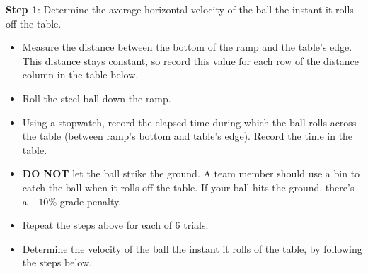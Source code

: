 \documentclass[../main-physics-workbook.tex]{subfiles}
\begin{document}
\vspace{1em}

\noindent \textbf{Step 1}: Determine the average horizontal velocity of the ball the instant it rolls off the table.

\begin{itemize}[itemsep=0pt,topsep=2pt]
    \item Measure the distance between the bottom of the ramp and the table's edge. This distance stays constant, so record this value for each row of the distance column in the table below.
    \item Roll the steel ball down the ramp.
    \item Using a stopwatch, record the elapsed time during which the ball rolls across the table (between ramp's bottom and table's edge). Record the time in the table.
    \item \textbf{DO NOT} let the ball strike the ground. A team member should use a bin to catch the ball when it rolls off the table. If your ball hits the ground, there's a $-10\%$ grade penalty.
    \item Repeat the steps above for each of 6 trials.
    \item Determine the velocity of the ball the instant it rolls of the table, by following the steps below.
\end{itemize}

\begin{center}
\end{center}
\end{document}
